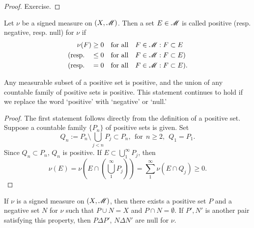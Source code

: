 \documentclass[12pt]{article} %
\begin{document}
\begin{proof}
    Exercise.
\end{proof}

\begin{definition}
    Let $\nu$ be a signed measure on $(X, \mathscr{M})$. Then a set $E \in \mathscr{M}$ is called positive (resp. negative, resp. null) for $\nu$ if \begin{align*}
        \nu(F) &\geq 0 \ \ \ \text{for all} \ \ \ F \in \mathscr{M} : F \subset E\\
        \text{(resp.} \ \ \ &\leq 0 \ \ \ \text{for all} \ \ \ F \in \mathscr{M} : F \subset E \text{)}\\
        \text{(resp.} \ \ \ &= 0 \ \ \ \text{for all} \ \ \ F \in \mathscr{M} : F \subset E \text{)}.
    \end{align*}
\end{definition}

\begin{lemma}
    Any measurable subset of a positive set is positive, and the union of any countable family of positive sets is positive. This statement continues to hold if we replace the word `positive' with `negative' or `null.'
\end{lemma}

\begin{proof}
    The first statement follows directly from the definition of a positive set. Suppose a countable family $\{P_n\}$ of positive sets is given. Set \[Q_n := P_n \setminus \bigcup_{j < n} P_j \subset P_n, \ \ \text{for} \ \ n \geq 2, \ \  Q_1 = P_1.\] Since $Q_n \subset P_n$, $Q_n$ is positive. If $E \subset \bigcup_1^\infty P_j$, then \[\nu(E) = \nu\left(E \cap \left(\bigcup_1^\infty P_j\right)\right) = \sum_1^\infty \nu(E \cap Q_j) \geq 0.\]
\end{proof}

\begin{lemma}\label{lem:hahn}
    If $\nu$ is a signed measure on $(X, \mathscr{M})$, then there exists a positive set $P$ and a negative set $N$ for $\nu$ such that $P \cup N = X$ and $P \cap N = \emptyset$. If $P', N'$ is another pair satisfying this property, then $P \Delta P'$, $N \Delta N'$ are null for $\nu$.
\end{lemma}
\end{document}
